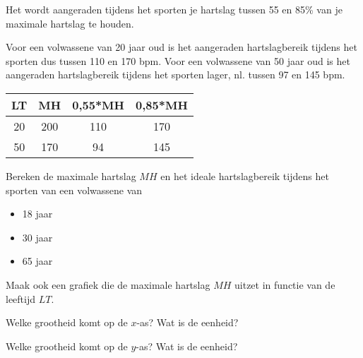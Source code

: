 Het wordt aangeraden tijdens het sporten je hartslag tussen 55 en 85\% van je maximale hartslag te houden. 

Voor een volwassene van 20 jaar oud is het aangeraden hartslagbereik tijdens het sporten dus tussen 110 en 170 bpm.
Voor een volwassene van 50 jaar oud is het aangeraden hartslagbereik tijdens het sporten lager, nl. tussen 97 en 145 bpm.

\begin{table}
	\centering
	\begin{tabular}{c|ccc}
		LT & MH & 0,55*MH & 0,85*MH \\
		\hline
		20 & 200 & 110 & 170 \\
		50 & 170 & 94 & 145 
	\end{tabular}
\end{table}

\begin{oef}
Bereken de maximale hartslag $MH$ en het ideale hartslagbereik tijdens het sporten van een volwassene van 
\begin{itemize}
	\item 18 jaar
	\item 30 jaar
	\item 65 jaar
\end{itemize}
\end{oef}

\begin{oef}Maak ook een grafiek die de maximale hartslag $MH$ uitzet in functie van de leeftijd $LT$. 

Welke grootheid komt op de $x$-as? Wat is de eenheid? 

Welke grootheid komt op de $y$-as? Wat is de eenheid?
\end{oef}

